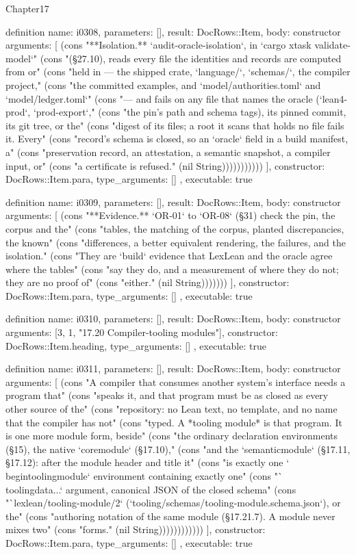 \begin{lexlean}{Chapter17}
\begin{semanticmodule}
definition{
  name: i0308,
  parameters: [],
  result: DocRows::Item,
  body: constructor{
    arguments: [
      (cons "**Isolation.** `audit-oracle-isolation`, in `cargo xtask validate-model`" (cons "(§27.10), reads every file the identities and records are computed from or" (cons "held in --- the shipped crate, `language/`, `schemas/`, the compiler project," (cons "the committed examples, and `model/authorities.toml` and `model/ledger.toml`" (cons "--- and fails on any file that names the oracle (`lean4-prod`, `prod-export`," (cons "the pin's path and schema tags), its pinned commit, its git tree, or the" (cons "digest of its files; a root it scans that holds no file fails it. Every" (cons "record's schema is closed, so an `oracle` field in a build manifest, a" (cons "preservation record, an attestation, a semantic snapshot, a compiler input, or" (cons "a certificate is refused." (nil String)))))))))))
    ],
    constructor: DocRows::Item.para,
    type_arguments: []
  },
  executable: true
}

definition{
  name: i0309,
  parameters: [],
  result: DocRows::Item,
  body: constructor{
    arguments: [
      (cons "**Evidence.** `OR-01` to `OR-08` (§31) check the pin, the corpus and the" (cons "tables, the matching of the corpus, planted discrepancies, the known" (cons "differences, a better equivalent rendering, the failures, and the isolation." (cons "They are `build` evidence that LexLean and the oracle agree where the tables" (cons "say they do, and a measurement of where they do not; they are no proof of" (cons "either." (nil String)))))))
    ],
    constructor: DocRows::Item.para,
    type_arguments: []
  },
  executable: true
}

definition{
  name: i0310,
  parameters: [],
  result: DocRows::Item,
  body: constructor{
    arguments: [3, 1, "17.20 Compiler-tooling modules"],
    constructor: DocRows::Item.heading,
    type_arguments: []
  },
  executable: true
}

definition{
  name: i0311,
  parameters: [],
  result: DocRows::Item,
  body: constructor{
    arguments: [
      (cons "A compiler that consumes another system's interface needs a program that" (cons "speaks it, and that program must be as closed as every other source of the" (cons "repository: no Lean text, no template, and no name that the compiler has not" (cons "typed. A *tooling module* is that program. It is one more module form, beside" (cons "the ordinary declaration environments (§15), the native `coremodule` (§17.10)," (cons "and the `semanticmodule` (§17.11, §17.12): after the module header and title it" (cons "is exactly one `\\begin{toolingmodule}` environment containing exactly one" (cons "`\\toolingdata{...}` argument, canonical JSON of the closed schema" (cons "`lexlean/tooling-module/2` (`tooling/schemas/tooling-module.schema.json`), or the" (cons "authoring notation of the same module (§17.21.7). A module never mixes two" (cons "forms." (nil String))))))))))))
    ],
    constructor: DocRows::Item.para,
    type_arguments: []
  },
  executable: true
}


\end{semanticmodule}
\end{lexlean}
